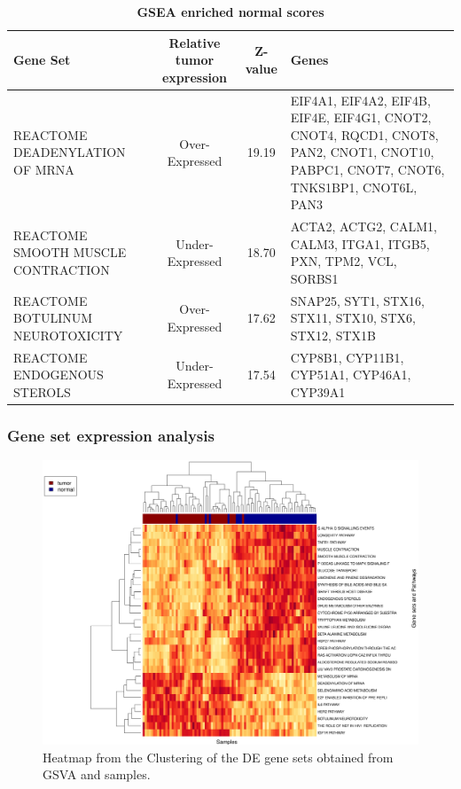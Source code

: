 \documentclass[9pt,twocolumn,twoside]{gsajnl}
\begin{document}
\begin{table}[!h]
\centering
\caption{\bf GSEA enriched normal scores}
\begin{tableminipage}{\textwidth}
\begin{tabular}{|l|c|c|p{4.5cm}|}
 \hline
Gene Set & Relative tumor expression &  Z-value & Genes \\
  \hline
REACTOME DEADENYLATION OF MRNA & Over-Expressed  & 19.19 & EIF4A1, EIF4A2, EIF4B, EIF4E, EIF4G1, CNOT2, CNOT4, RQCD1, CNOT8, PAN2, CNOT1, CNOT10, PABPC1, CNOT7, CNOT6, TNKS1BP1, CNOT6L, PAN3 \\
REACTOME SMOOTH MUSCLE CONTRACTION & Under-Expressed & 18.70 & ACTA2, ACTG2, CALM1, CALM3, ITGA1, ITGB5, PXN, TPM2, VCL, SORBS1 \\
REACTOME BOTULINUM NEUROTOXICITY & Over-Expressed &  17.62 & SNAP25, SYT1, STX16, STX11, STX10, STX6, STX12, STX1B \\
REACTOME ENDOGENOUS STEROLS & Under-Expressed & 17.54 & CYP8B1, CYP11B1, CYP51A1, CYP46A1, CYP39A1 \\
\hline
\end{tabular}
\label{tab:GSEAenrichment}
\end{tableminipage}
\end{table}


\subsubsection*{Gene set expression analysis}



\begin{figure}[!h]
\centering
\includegraphics[width=1.1\textwidth]{ClusteringGSVA.eps}
\caption{Heatmap from the Clustering of the DE gene sets obtained from GSVA and samples.}
\label{fig:ClusteringGSVA}
\end{figure}
\end{document}
